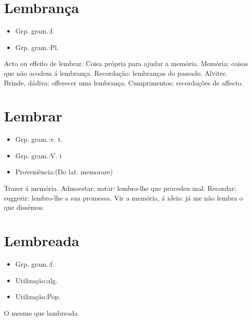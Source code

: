 \section{Lembrança}
\begin{itemize}
\item {Grp. gram.:f.}
\end{itemize}
\begin{itemize}
\item {Grp. gram.:Pl.}
\end{itemize}
Acto ou effeito de lembrar.
Coisa própria para ajudar a memória.
Memória: \textunderscore coisas que não acodem á lembrança\textunderscore .
Recordação: \textunderscore lembranças do passado\textunderscore .
Alvitre.
Brinde, dádiva: \textunderscore offerecer uma lembrança\textunderscore .
Cumprimentos; recordações de affecto.
\section{Lembrar}
\begin{itemize}
\item {Grp. gram.:v. t.}
\end{itemize}
\begin{itemize}
\item {Grp. gram.:V. i}
\end{itemize}
\begin{itemize}
\item {Proveniência:(Do lat. \textunderscore memorare\textunderscore )}
\end{itemize}
Trazer á memória.
Admoestar; notar: \textunderscore lembro-lhe que procedeu mal\textunderscore .
Recordar; suggerir: \textunderscore lembro-lhe a sua promessa\textunderscore .
Vir a memória, á ideia: \textunderscore já me não lembra o que dissémos\textunderscore .
\section{Lembreada}
\begin{itemize}
\item {Grp. gram.:f.}
\end{itemize}
\begin{itemize}
\item {Utilização:alg.}
\end{itemize}
\begin{itemize}
\item {Utilização:Pop.}
\end{itemize}
O mesmo que \textunderscore lambreada\textunderscore .
